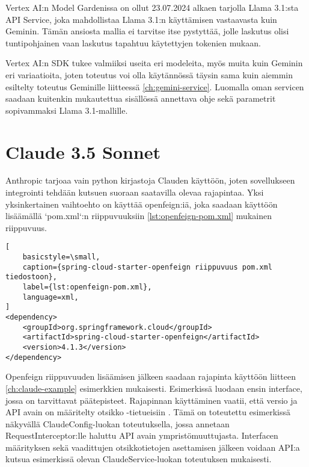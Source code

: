 Vertex AI:n Model Gardenissa on ollut 23.07.2024 alkaen tarjolla Llama 3.1:sta
API Service, joka mahdollistaa Llama 3.1:n käyttämisen vastaavasta kuin
Geminin. Tämän ansiosta mallia ei tarvitse itse pystyttää, jolle laskutus olisi
tuntipohjainen vaan laskutus tapahtuu käytettyjen tokenien mukaan.
\parencite{vertexAiModelGardenLlama3}

Vertex AI:n SDK tukee valmiiksi useita eri modeleita, myös muita kuin Geminin
eri variaatioita, joten toteutus voi olla käytännössä täysin sama kuin aiemmin
esiltelty toteutus Geminille liitteessä \ref{ch:gemini-service}. Luomalla oman
servicen saadaan kuitenkin mukautettua sisällössä annettava ohje sekä
parametrit sopivammaksi Llama 3.1-mallille.

\section{Claude 3.5 Sonnet}

Anthropic tarjoaa vain python kirjastoja Clauden käyttöön, joten sovellukseen
integrointi tehdään kutsuen suoraan saatavilla olevaa rajapintaa. Yksi
yksinkertainen vaihtoehto on käyttää openfeign:iä, joka saadaan käyttöön
lisäämällä `pom.xml`:n riippuvuuksiin \ref{lst:openfeign-pom.xml} mukainen
riippuvuus.

\begin{lstlisting}[
    basicstyle=\small,
    caption={spring-cloud-starter-openfeign riippuvuus pom.xml tiedostoon},
    label={lst:openfeign-pom.xml},
    language=xml,
]
<dependency>
    <groupId>org.springframework.cloud</groupId>
    <artifactId>spring-cloud-starter-openfeign</artifactId>
    <version>4.1.3</version>
</dependency>
\end{lstlisting}

Openfeign riippuvuuden lisäämisen jälkeen saadaan rajapinta käyttöön liitteen
\ref{ch:claude-example} esimerkkien mukaisesti. Esimerkissä luodaan ensin
interface, jossa on tarvittavat päätepisteet. Rajapinnan käyttäminen vaatii,
että versio ja API avain on määritelty otsikko -tietueisiin
\parencite{anthropicAPIDocsVersions}
\parencite{anthropicAPIDocsGettingStarted}. Tämä on toteutettu esimerkissä
näkyvällä ClaudeConfig-luokan toteutuksella, jossa annetaan
RequestInterceptor:lle haluttu API avain ympristömuuttujasta. Interfacen
määrityksen sekä vaadittujen otsikkotietojen asettamisen jälkeen voidaan API:a
kutsua esimerkissä olevan ClaudeService-luokan toteutuksen mukaisesti.
